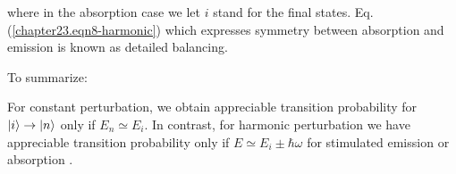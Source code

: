 where in the absorption case we let $i$ stand for the final states. Eq. (\ref{chapter23.eqn8-harmonic}) which expresses symmetry between absorption and emission is known as detailed balancing.

To summarize:


	For constant perturbation, we obtain appreciable transition probability for $\ket{i} \rightarrow \ket{n}$ only if $E_n \simeq E_i$. In contrast, for harmonic perturbation we have appreciable transition probability only if $E \simeq E_i \pm \hbar\omega$ for stimulated emission or absorption .